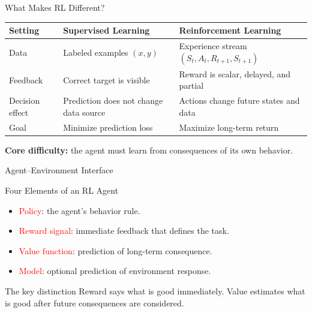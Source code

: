 \documentclass[aspectratio=169]{beamer}
\newcommand{\red}[1]{\textcolor{red}{#1}}
\begin{document}
\begin{frame}{What Makes RL Different?}
\small
\begin{tabular}{>{\raggedright\arraybackslash}p{}
                >{\raggedright\arraybackslash}p{}
                >{\raggedright\arraybackslash}p{}}
\toprule
Setting & Supervised Learning & Reinforcement Learning \\
\midrule
Data & Labeled examples $(x,y)$ & Experience stream $(S_t,A_t,R_{t+1},S_{t+1})$ \\
Feedback & Correct target is visible & Reward is scalar, delayed, and partial \\
Decision effect & Prediction does not change data source & Actions change future states and data \\
Goal & Minimize prediction loss & Maximize long-term return \\
\bottomrule
\end{tabular}

\vspace{0.9em}
\textbf{Core difficulty:} the agent must learn from consequences of its own behavior.
\end{frame}

\begin{frame}{Agent--Environment Interface}
\centering
{}
\end{frame}

\begin{frame}{Four Elements of an RL Agent}
\small
\begin{itemize}
    \item \red{Policy}: the agent's behavior rule.
    \item \red{Reward signal}: immediate feedback that defines the task.
    \item \red{Value function}: prediction of long-term consequence.
    \item \red{Model}: optional prediction of environment response.
\end{itemize}

\vspace{0.8em}
\begin{block}{The key distinction}
Reward says what is good immediately. Value estimates what is good after future consequences are considered.
\end{block}
\end{frame}
\end{document}
